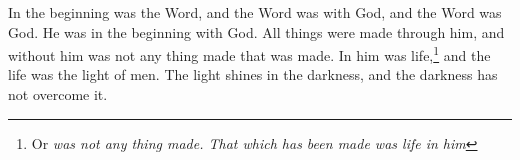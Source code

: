 \documentclass{memoir}
\begin{document}
\begin{multicols}{2}
  In the beginning was the Word, and the Word was with God,
  and the Word was God. He was in the beginning
  with God. All things were made through him, and without him was not any
  thing made that was made. In him was life,\footnote{Or \emph{was not any thing made. That which
  has been made was life in him}} and the life
  was the light of men.  \crossref{[ch.\ 3:19]}The light shines in the
  darkness, and the darkness has not overcome it.
\end{multicols}
\end{document}
